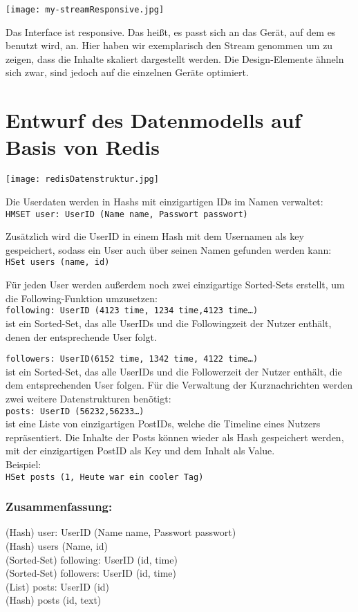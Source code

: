    \begin{center}
      \texttt{[image: my-streamResponsive.jpg]}
    \end{center}

    Das Interface ist responsive. Das heißt, es passt sich an das Gerät, auf dem es benutzt wird, an. Hier haben wir exemplarisch den Stream genommen um zu zeigen, dass die Inhalte skaliert dargestellt werden. Die Design-Elemente ähneln sich zwar, sind jedoch auf die einzelnen Geräte optimiert.

\newpage
  \section{Entwurf des Datenmodells auf Basis von Redis}
  \begin{center}
    \texttt{[image: redisDatenstruktur.jpg]}
  \end{center}

  Die Userdaten werden in Hashs mit einzigartigen IDs im Namen verwaltet: \\
  \texttt{HMSET user: UserID (Name name, Passwort passwort)}

  Zusätzlich wird die UserID in einem Hash mit dem Usernamen als key gespeichert, sodass ein User auch über seinen Namen gefunden werden kann: \\
  \texttt{HSet users (name, id)}

  Für jeden User werden außerdem noch zwei einzigartige Sorted-Sets erstellt, um die Following-Funktion umzusetzen: \\
  \texttt{following: UserID (4123 time, 1234 time,4123 time…)} \\ ist ein Sorted-Set, das alle UserIDs und die Followingzeit der Nutzer enthält, denen der entsprechende User folgt.

  \texttt{followers: UserID(6152 time, 1342 time, 4122 time…)} \\ ist ein Sorted-Set, das alle UserIDs und die Followerzeit der Nutzer enthält, die dem entsprechenden User folgen.
  Für die Verwaltung der Kurznachrichten werden zwei weitere Datenstrukturen benötigt: \\
  \texttt{posts: UserID (56232,56233…)} \\ ist eine Liste von einzigartigen PostIDs, welche die Timeline eines Nutzers repräsentiert.
  Die Inhalte der Posts können wieder als Hash gespeichert werden, mit der einzigartigen PostID als Key und dem Inhalt als Value. \\Beispiel: \\
  \texttt{HSet posts (1, Heute war ein cooler Tag)}

\newpage
  \subsubsection{Zusammenfassung:}
  (Hash) user: UserID (Name name, Passwort passwort) \\
  (Hash) users (Name, id) \\
  (Sorted-Set) following: UserID (id, time) \\
  (Sorted-Set) followers: UserID (id, time) \\
  (List) posts: UserID (id) \\
  (Hash) posts (id, text)
